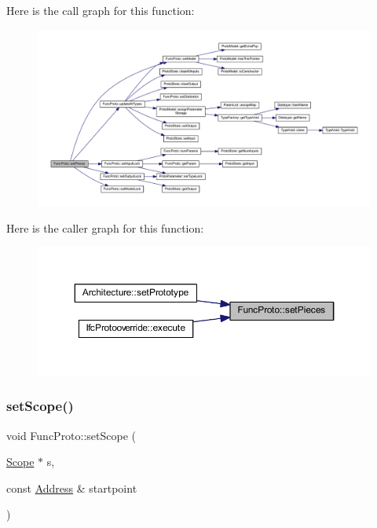 Here is the call graph for this function\+:
\nopagebreak
\begin{figure}[H]
\begin{center}
\leavevmode
\includegraphics[width=350pt]{class_func_proto_a8e6f53c7733c8aa58d9138a8f3add2ce_cgraph}
\end{center}
\end{figure}
Here is the caller graph for this function\+:
\nopagebreak
\begin{figure}[H]
\begin{center}
\leavevmode
\includegraphics[width=350pt]{class_func_proto_a8e6f53c7733c8aa58d9138a8f3add2ce_icgraph}
\end{center}
\end{figure}
\mbox{\label{class_func_proto_adc83eddece4cb123d198ad288dfa89bd}} 
\subsubsection{\texorpdfstring{setScope()}{setScope()}}
{\footnotesize\ttfamily void Func\+Proto\+::set\+Scope (\begin{DoxyParamCaption}\item[{\mbox{\hyperlink{class_scope}{Scope}} $\ast$}]{s,  }\item[{const \mbox{\hyperlink{class_address}{Address}} \&}]{startpoint }\end{DoxyParamCaption})}



